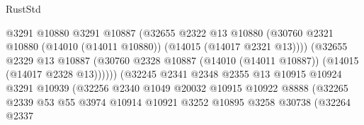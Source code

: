 \begin{lexlean}{RustStd}
\begin{coremodule}
                                          @3291
                                          @10880
                                          @3291
                                          @10887
                                          (@32655
                                            @2322
                                            @13
                                            @10880
                                            (@30760
                                              @2321
                                              @10880
                                              (@14010 (@14011 @10880))
                                              (@14015 (@14017 @2321 @13))))
                                          (@32655
                                            @2329
                                            @13
                                            @10887
                                            (@30760
                                              @2328
                                              @10887
                                              (@14010 (@14011 @10887))
                                              (@14015 (@14017 @2328 @13))))))
                                      (@32245
                                        @2341
                                        @2348
                                        @2355
                                        @13
                                        @10915
                                        @10924
                                        @3291
                                        @10939
                                        (@32256
                                          @2340
                                          @1049
                                          @20032
                                          @10915
                                          @10922
                                          @8888
                                          (@32265
                                            @2339
                                            @53
                                            @55
                                            @3974
                                            @10914
                                            @10921
                                            @3252
                                            @10895
                                            @3258
                                            @30738
                                            (@32264
                                              @2337

\end{coremodule}
\end{lexlean}
